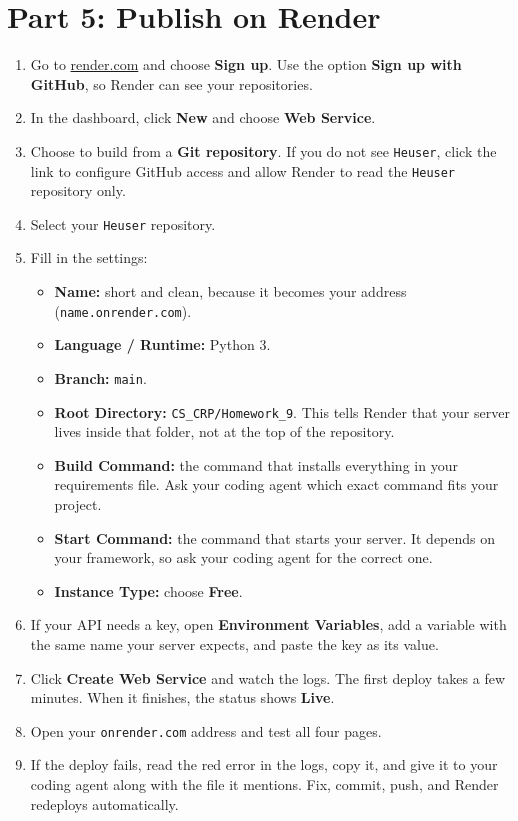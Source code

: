 \documentclass[11pt,a4paper]{article}
\begin{document}
\section{Part 5: Publish on Render}
\begin{enumerate}
\item Go to \href{https://render.com}{render.com} and choose \textbf{Sign up}. Use the option \textbf{Sign up with GitHub}, so Render can see your repositories.
\item In the dashboard, click \textbf{New} and choose \textbf{Web Service}.
\item Choose to build from a \textbf{Git repository}. If you do not see \texttt{Heuser}, click the link to configure GitHub access and allow Render to read the \texttt{Heuser} repository only.
\item Select your \texttt{Heuser} repository.
\item Fill in the settings:
\begin{itemize}
\item \textbf{Name:} short and clean, because it becomes your address (\texttt{name.onrender.com}).
\item \textbf{Language / Runtime:} Python 3.
\item \textbf{Branch:} \texttt{main}.
\item \textbf{Root Directory:} \texttt{CS\_CRP/Homework\_9}. This tells Render that your server lives inside that folder, not at the top of the repository.
\item \textbf{Build Command:} the command that installs everything in your requirements file. Ask your coding agent which exact command fits your project.
\item \textbf{Start Command:} the command that starts your server. It depends on your framework, so ask your coding agent for the correct one.
\item \textbf{Instance Type:} choose \textbf{Free}.
\end{itemize}
\item If your API needs a key, open \textbf{Environment Variables}, add a variable with the same name your server expects, and paste the key as its value.
\item Click \textbf{Create Web Service} and watch the logs. The first deploy takes a few minutes. When it finishes, the status shows \textbf{Live}.
\item Open your \texttt{onrender.com} address and test all four pages.
\item If the deploy fails, read the red error in the logs, copy it, and give it to your coding agent along with the file it mentions. Fix, commit, push, and Render redeploys automatically.
\end{enumerate}
\end{document}
